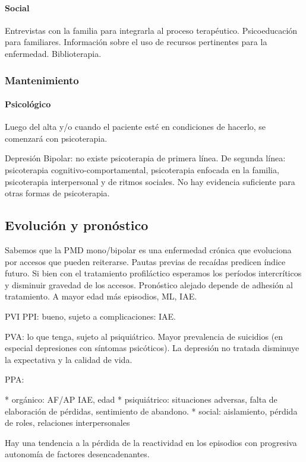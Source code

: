 \documentclass{scrbook}
\begin{document}
\paragraph{Social}

Entrevistas con la familia para integrarla al proceso terapéutico. Psicoeducación para familiares. Información sobre el uso de recursos pertinentes para la enfermedad. Biblioterapia.
\subsubsection*{Mantenimiento}
\paragraph{Psicológico}
Luego del alta y/o cuando el paciente esté en condiciones de hacerlo, se comenzará con psicoterapia.

Depresión Bipolar: no existe psicoterapia de primera línea. De segunda línea: psicoterapia cognitivo-comportamental, psicoterapia enfocada en la familia, psicoterapia interpersonal y de ritmos sociales. No hay evidencia suficiente para otras formas de psicoterapia\cite{yatham2018canadian}.
\subsection*{Evolución y pronóstico}

Sabemos que la PMD mono/bipolar es una enfermedad crónica que evoluciona por accesos que pueden reiterarse. Pautas previas de recaídas predicen índice futuro. Si bien con el tratamiento profiláctico esperamos los períodos intercríticos y disminuir gravedad de los accesos. Pronóstico alejado depende de adhesión al tratamiento. A mayor edad más episodios, ML, IAE.

PVI PPI: bueno, sujeto a complicaciones: IAE.

PVA: lo que tenga, sujeto al psiquiátrico. Mayor prevalencia de suicidios (en especial depresiones con síntomas psicóticos). La depresión no tratada disminuye la expectativa y la calidad de vida.

PPA:

* orgánico: AF/AP IAE, edad
* psiquiátrico: situaciones adversas, falta de elaboración de pérdidas, sentimiento de abandono.
* social: aislamiento, pérdida de roles, relaciones interpersonales

Hay una tendencia a la pérdida de la reactividad en los episodios con progresiva autonomía de factores desencadenantes.
\end{document}
